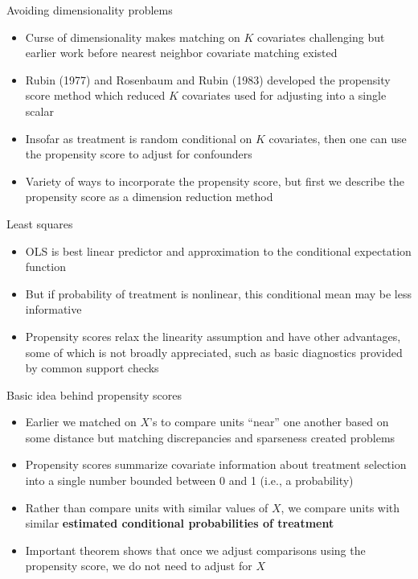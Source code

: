 \documentclass{beamer}
\begin{document}
\begin{frame}{Avoiding dimensionality problems}
	
	\begin{itemize}
	\item Curse of dimensionality makes matching on $K$ covariates challenging but earlier work before nearest neighbor covariate matching existed
	\item Rubin (1977) and Rosenbaum and Rubin (1983) developed the propensity score method which reduced $K$ covariates used for adjusting into a single scalar
	\item Insofar as treatment is random conditional on $K$ covariates, then one can use the propensity score to adjust for confounders
	\item Variety of ways to incorporate the propensity score, but first we describe the propensity score as a dimension reduction method 
	\end{itemize}
	
\end{frame}



\begin{frame}{Least squares}
	
	\begin{itemize}
	\item OLS is best linear predictor and approximation to the conditional expectation function 
	\item But if probability of treatment is nonlinear, this conditional mean may be less informative
	\item Propensity scores relax the linearity assumption and have other advantages, some of which is not broadly appreciated, such as basic diagnostics provided by common support checks
	\end{itemize}
	
\end{frame}



\begin{frame}{Basic idea behind propensity scores}
	
	\begin{itemize}
	\item Earlier we matched on $X$'s to compare units ``near'' one another based on some distance but matching discrepancies and sparseness created problems
	\item Propensity scores summarize covariate information about treatment selection into a single number bounded between 0 and 1 (i.e., a probability)
	\item Rather than compare units with similar values of $X$, we compare units with similar \textbf{estimated conditional probabilities of treatment}
	\item Important theorem shows that once we adjust comparisons using the propensity score, we do not need to adjust for $X$
	\end{itemize}
\end{frame}
\end{document}
